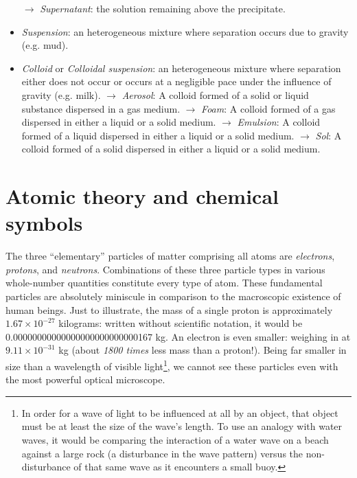 \begin{itemize}
\subitem $\rightarrow$ \textit{Supernatant}: the solution remaining above the precipitate.  
\item \textit{Suspension}: an heterogeneous mixture where separation occurs due to gravity (e.g. mud).  
\item \textit{Colloid} or \textit{Colloidal suspension}: an heterogeneous mixture where separation either does not occur or occurs at a negligible pace under the influence of gravity (e.g. milk).  
\subitem $\rightarrow$ \textit{Aerosol}: A colloid formed of a solid or liquid substance dispersed in a gas medium. 
\subitem $\rightarrow$ \textit{Foam}: A colloid formed of a gas dispersed in either a liquid or a solid medium. 
\subitem $\rightarrow$ \textit{Emulsion}: A colloid formed of a liquid dispersed in either a liquid or a solid medium. 
\subitem $\rightarrow$ \textit{Sol}: A colloid formed of a solid dispersed in either a liquid or a solid medium. 
\end{itemize}






\filbreak
\section{Atomic theory and chemical symbols}

The three ``elementary'' particles of matter comprising all atoms are \textit{electrons}, \textit{protons}, and \textit{neutrons}.  Combinations of these three particle types in various whole-number quantities constitute every type of atom.  These fundamental particles are absolutely miniscule in comparison to the macroscopic existence of human beings.  Just to illustrate, the mass of a single proton is approximately $1.67 \times 10^{-27}$ kilograms: written without scientific notation, it would be 0.00000000000000000000000000167 kg.  An electron is even smaller: weighing in at $9.11 \times 10^{-31}$ kg (about \textit{1800 times} less mass than a proton!).  Being far smaller in size than a wavelength of visible light\footnote{In order for a wave of light to be influenced at all by an object, that object must be at least the size of the wave's length.  To use an analogy with water waves, it would be comparing the interaction of a water wave on a beach against a large rock (a disturbance in the wave pattern) versus the non-disturbance of that same wave as it encounters a small buoy.}, we cannot see these particles even with the most powerful optical microscope.

